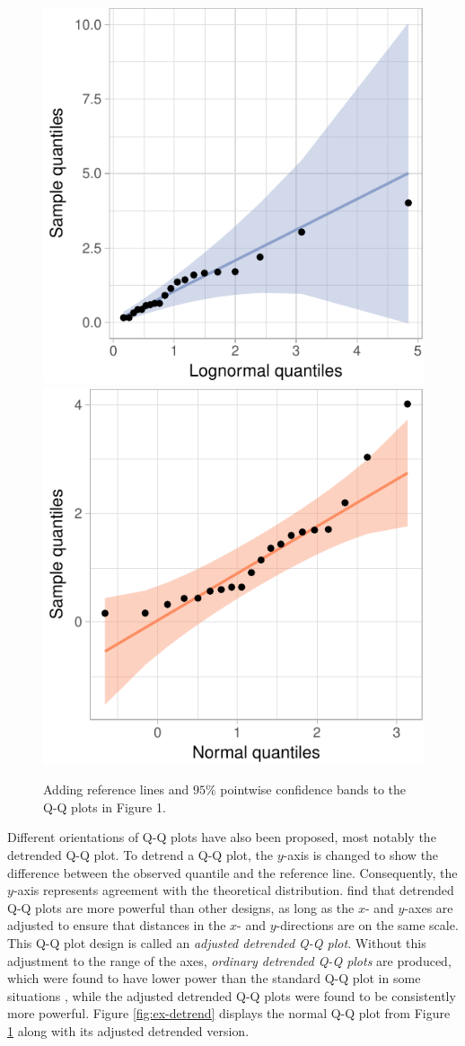 \begin{Schunk}
\begin{figure}

{\centering \includegraphics[width=.4\linewidth]{loy-figures/ex-qq2-1} \includegraphics[width=.4\linewidth]{loy-figures/ex-qq2-2} 

}

\caption[Adding reference lines and $95\%$ pointwise confidence bands to the Q-Q plots in Figure 1]{Adding reference lines and $95\%$ pointwise confidence bands to the Q-Q plots in Figure 1.}\label{fig:ex-qq2}
\end{figure}
\end{Schunk}

Different orientations of Q-Q plots have also been proposed, most
notably the detrended Q-Q plot. To detrend a Q-Q plot, the \(y\)-axis is
changed to show the difference between the observed quantile and the
reference line. Consequently, the \(y\)-axis represents agreement with
the theoretical distribution. \citet{Loy2016-fg} find that detrended Q-Q
plots are more powerful than other designs, as long as the \(x\)- and
\(y\)-axes are adjusted to ensure that distances in the \(x\)- and
\(y\)-directions are on the same scale. This Q-Q plot design is called
an \emph{adjusted detrended Q-Q plot}. Without this adjustment to the
range of the axes, \emph{ordinary detrended Q-Q plots} are produced,
which were found to have lower power than the standard Q-Q plot in some
situations \citep{Loy2016-fg}, while the adjusted detrended Q-Q plots
were found to be consistently more powerful. Figure \ref{fig:ex-detrend}
displays the normal Q-Q plot from Figure \ref{fig:ex-qq2} along with its
adjusted detrended version.

